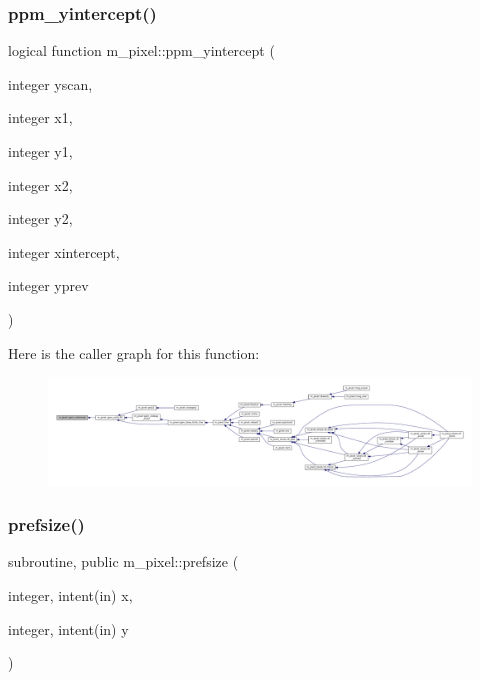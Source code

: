 \subsubsection{\texorpdfstring{ppm\+\_\+yintercept()}{ppm\_yintercept()}}
{\footnotesize\ttfamily logical function m\+\_\+pixel\+::ppm\+\_\+yintercept (\begin{DoxyParamCaption}\item[{integer}]{yscan,  }\item[{integer}]{x1,  }\item[{integer}]{y1,  }\item[{integer}]{x2,  }\item[{integer}]{y2,  }\item[{integer}]{xintercept,  }\item[{integer}]{yprev }\end{DoxyParamCaption})\hspace{0.3cm}{\ttfamily [private]}}

Here is the caller graph for this function\+:
\nopagebreak
\begin{figure}[H]
\begin{center}
\leavevmode
\includegraphics[width=350pt]{namespacem__pixel_a4924b3a5033acb74a4f4df60a4ba21eb_icgraph}
\end{center}
\end{figure}
\mbox{\label{namespacem__pixel_acc868686f05b7e0b3cd33bf9d1c6bb98}} 
\subsubsection{\texorpdfstring{prefsize()}{prefsize()}}
{\footnotesize\ttfamily subroutine, public m\+\_\+pixel\+::prefsize (\begin{DoxyParamCaption}\item[{integer, intent(in)}]{x,  }\item[{integer, intent(in)}]{y }\end{DoxyParamCaption})}



